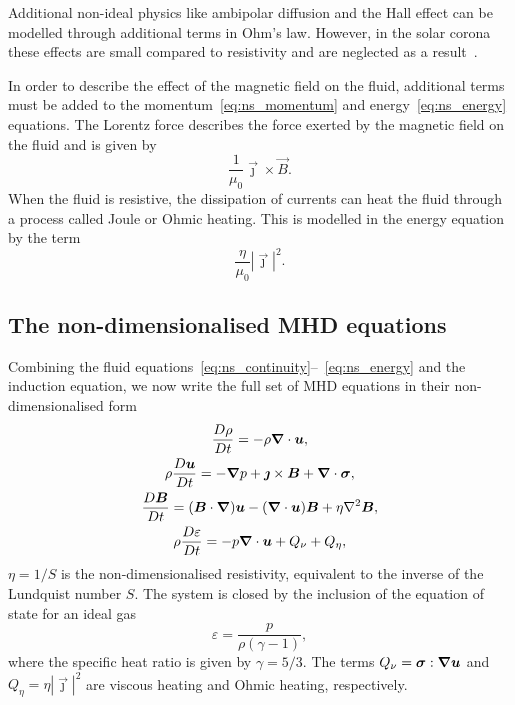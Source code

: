 Additional non-ideal physics like ambipolar diffusion and the Hall effect can be modelled through additional terms in Ohm's law. However, in the solar corona these effects are small compared to resistivity and are neglected as a result~\cite{priestMagnetohydrodynamicsSuna}.

In order to describe the effect of the magnetic field on the fluid, additional terms must be added to the momentum~\ref{eq:ns_momentum} and energy~\ref{eq:ns_energy} equations. The Lorentz force describes the force exerted by the magnetic field on the fluid and is given by
\begin{equation}
  \label{eq:lorentz_force}
\frac{1}{\mu_0}\vec{\jmath} \times \vec{B}.
\end{equation}
When the fluid is resistive, the dissipation of currents can heat the fluid through a process called Joule or Ohmic heating. This is modelled in the energy equation by the term
\begin{equation}
\frac{\eta}{\mu_0} | \vec{\jmath} |^2.
\end{equation}

\subsection{The non-dimensionalised MHD equations}

\label{sec:mhd_equations}

Combining the fluid equations~\ref{eq:ns_continuity}--~\ref{eq:ns_energy} and the induction equation, we now write the full set of MHD equations in their non-dimensionalised form
\begin{gather}
\label{eq:mhda}
\frac{D\rho}{Dt} = - \rho \vec{\nabla} \cdot \vec{u},\\
\rho\frac{D\vec{u}}{Dt} = -\vec{\nabla} p + \vec{\jmath} \times \vec{B} + \vec{\nabla} \cdot \ten{\sigma},\\
\frac{D\vec{B}}{Dt} = (\vec{B} \cdot \vec{\nabla})\vec{u} - (\vec{\nabla} \cdot \vec{u})\vec{B} + \eta \nabla^2 \vec{B},\\
\rho\frac{D\varepsilon}{Dt} = -p \vec{\nabla} \cdot \vec{u} + {Q}_{\nu} + {Q}_{\eta},%
\label{eq:energy}
\end{gather}
$\eta = 1/S$ is the non-dimensionalised resistivity, equivalent
to the inverse of the Lundquist number $S$. The system is closed by the inclusion of the equation of state for an ideal gas
\begin{equation}
\varepsilon = \frac{p}{\rho(\gamma - 1)},
\end{equation}
where the specific heat ratio is given by $\gamma = 5/3$. The
  terms ${Q}_{\nu} = {\bm \sigma} : {\bm \nabla}{\bm u}$ and
  ${Q}_{\eta} = \eta | \vec{\jmath} |^2$ are viscous heating and Ohmic heating, respectively.

